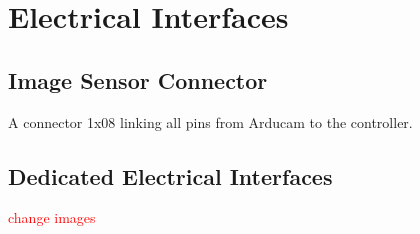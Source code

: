 \section{Electrical Interfaces}

\subsection{Image Sensor Connector}

A connector 1x08 linking all pins from Arducam to the controller.

\subsection{Dedicated Electrical Interfaces}

\textcolor{red}{change images}

